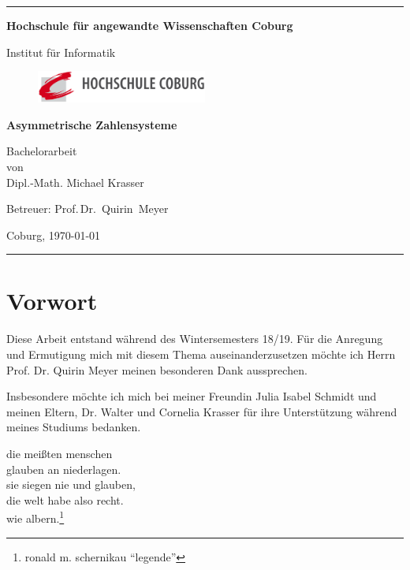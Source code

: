 \documentclass[a4paper,12pt]{article}
\begin{document}
\begin{titlepage}
\thispagestyle{empty} \enlargethispage{1.4in}

\begin{center}

\rule[1ex]{157.5mm}{0.5mm}

\LARGE\bf Hochschule für angewandte Wissenschaften Coburg\\

\vfill

\rm Institut für Informatik


\begin{figure}
	    \centering
				     \includegraphics[width=0.5\textwidth]{Logo.png}
\end{figure}

\vfill

\Huge \bf Asymmetrische Zahlensysteme

\vfill

\Large Bachelorarbeit \\ [1ex] von \\ [1ex]
Dipl.-Math. Michael Krasser

\vfill

Betreuer:  Prof.\,Dr.~Quirin~Meyer

\vfill

Coburg, \today

\rule[-1ex]{157.5mm}{0.5mm}

\vfill

\end{center}

\end{titlepage}
\newpage
\section*{Vorwort}
Diese Arbeit entstand während des Wintersemesters 18/19. Für die Anregung und Ermutigung mich mit diesem Thema auseinanderzusetzen möchte ich Herrn Prof. Dr. Quirin Meyer meinen besonderen Dank aussprechen.
\par
\vspace{5mm}
\par
Insbesondere möchte ich mich bei meiner Freundin Julia Isabel Schmidt und meinen Eltern, Dr. Walter und Cornelia Krasser für ihre Unterstützung während meines Studiums bedanken.
\pagebreak
\newpage
\begin{center}
	die meißten menschen
	\\
	glauben an niederlagen.
	\\
	sie siegen nie und glauben,
	\\
	die welt habe also recht.
	\\
	wie albern.\footnote{ronald m. schernikau "`legende"'}
\end{center}
\end{document}
